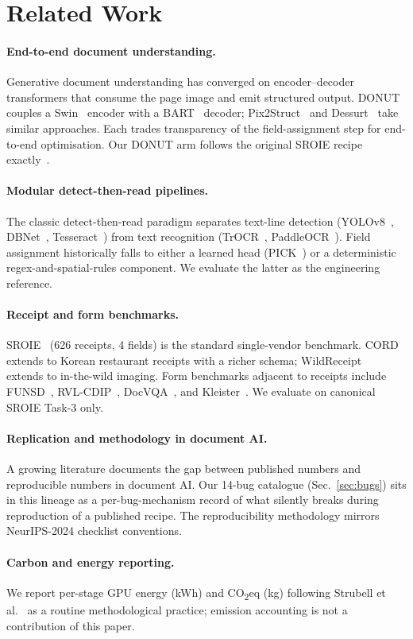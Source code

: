 \section{Related Work}
\label{sec:related}

\paragraph{End-to-end document understanding.}
Generative document understanding has converged on encoder--decoder
transformers that consume the page image and emit structured output.
DONUT~\cite{kim2022donut} couples a Swin~\cite{liu2021swin} encoder
with a BART~\cite{lewis2020bart} decoder; Pix2Struct~\cite{lee2023pix2struct}
and Dessurt~\cite{davis2022dessurt} take similar approaches.  Each
trades transparency of the field-assignment step for end-to-end
optimisation.  Our DONUT arm follows the original SROIE recipe
exactly~\cite{kim2022donut}.

\paragraph{Modular detect-then-read pipelines.}
The classic detect-then-read paradigm separates text-line detection
(YOLOv8~\cite{jocher2023yolov8}, DBNet~\cite{liao2020dbnet},
Tesseract~\cite{smith2007tesseract}) from text recognition
(TrOCR~\cite{li2023trocr}, PaddleOCR~\cite{paddleocr}).  Field
assignment historically falls to either a learned head
(PICK~\cite{yu2020pick}) or a deterministic regex-and-spatial-rules
component.  We evaluate the latter as the engineering reference.

\paragraph{Receipt and form benchmarks.}
SROIE~\cite{huang2019icdar} (626 receipts, 4 fields) is the standard
single-vendor benchmark.  CORD~\cite{park2019cord} extends to Korean
restaurant receipts with a richer schema; WildReceipt~\cite{sun2021wildreceipt}
extends to in-the-wild imaging.  Form benchmarks adjacent to receipts
include FUNSD~\cite{jaume2019funsd}, RVL-CDIP~\cite{harley2015rvlcdip},
DocVQA~\cite{mathew2021docvqa}, and Kleister~\cite{stanislawek2021kleister}.
We evaluate on canonical SROIE Task-3 only.

\paragraph{Replication and methodology in document AI.}
A growing literature documents the gap between published numbers
and reproducible numbers in document AI.  Our 14-bug catalogue
(Sec.~\ref{sec:bugs}) sits in this lineage as a per-bug-mechanism
record of what silently breaks during reproduction of a published
recipe.  The reproducibility methodology mirrors NeurIPS-2024
checklist conventions.

\paragraph{Carbon and energy reporting.}
We report per-stage GPU energy (kWh) and CO\textsubscript{2}eq (kg)
following Strubell et al.~\cite{strubell2019energy} as a routine
methodological practice; emission accounting is not a contribution
of this paper.
